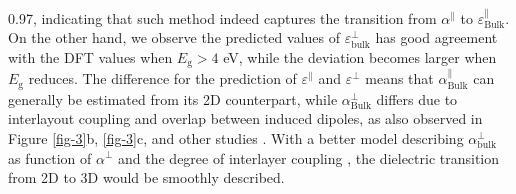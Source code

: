 \documentclass[journal=ancac3,manuscript=article,email=true,hyperref=true,keywords=false]{achemso}
\begin{document}
0.97, indicating that such method indeed captures the transition from
$\alpha^{\parallel}$ to $\varepsilon_{\mathrm{Bulk}}^{\parallel}$. On
the other hand, we observe the predicted values of
$\varepsilon_{\mathrm{bulk}}^{\perp}$ has good agreement with the DFT
values when $E_{\mathrm{g}}>4$ eV, while the deviation becomes larger
when $E_{\mathrm{g}}$ reduces. The difference for the prediction of
$\varepsilon^{\parallel}$ and $\varepsilon^{\perp}$ means that
$\alpha^{\parallel}_{\mathrm{Bulk}}$ can generally be estimated from
its 2D counterpart, while $\alpha^{\perp}_{\mathrm{Bulk}}$ differs due
to interlayout coupling and overlap between induced dipoles, as also
observed in Figure \ref{fig-3}b, \ref{fig-3}c, and other studies
\cite{Andersen_2015_dielec_vdWH,Laturia_2018}. With a better model
describing $\alpha_{\mathrm{bulk}}^{\perp}$ as function of
$\alpha^{\perp}$ and the degree of interlayer coupling \cite{Tkatchenko_2012}, the dielectric transition from 2D to 3D would
be smoothly described. 
\end{document}
